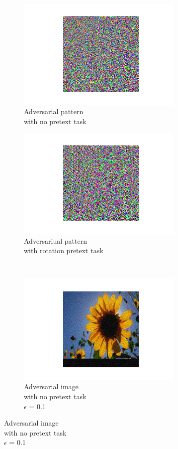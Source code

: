 \begin{figure}[h]
    \begin{subfigure}{0.4\textwidth}
        \caption{Adversarial pattern \\ with no pretext task}
        \centering
        \includegraphics[width=8cm]{images/sunflower_adv_pattern}
    \end{subfigure}
    \begin{subfigure}{0.4\textwidth}
        \caption{Adversariual pattern \\ with rotation pretext task}
        \centering
        \includegraphics[width=8cm]{images/sunflowers_pr_adv_pattern}
    \end{subfigure}
    \\
    \begin{subfigure}{0.4\textwidth}
        \caption{Adversarial image \\ with no pretext task \\ $\epsilon$ = 0.1}
        \centering
        \includegraphics[width=8cm]{images/sunflower_adv_attack_01}

\end{subfigure}
\end{figure}
